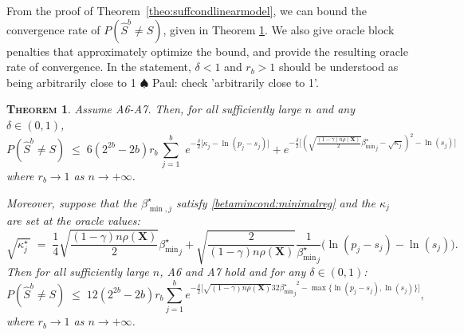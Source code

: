 \documentclass[aos]{imsart}
\theoremstyle{plain}
\newtheorem{thm}{\textsc{Theorem}}[section]
\newcommand{\paul}[1]{{\small{\color{green} \sf $\spadesuit$ Paul: #1}}}
\newcommand{\bs}{\boldsymbol}
\begin{document}
From the proof of Theorem~\ref{theo:suffcondlinearmodel}, we can bound the convergence rate of $P(\hat S^{b}\neq S)$, given in Theorem \ref{prop:fullrecovreg}. We also give oracle block penalties that approximately optimize the bound, and provide the resulting oracle rate of convergence. 
In the statement, $\delta<1$ and $r_b>1$ should be understood as being arbitrarily close to 1 \paul{check 'arbitrarily close to 1'}.
\begin{thm}\label{prop:fullrecovreg}
Assume A6-A7. Then, for all sufficiently large $n$ and any $\delta \in (0,1)$,
\begin{equation}\label{eq:rateconvreg}
 P(\hat{S}^{b} \neq S)\;\leq\; 6(2^{2b}-2b)r_b\,\sum_{j=1}^b\,\, e^{-\tfrac{\delta}{2}\big[\kappa_j-\ln(p_j-s_j)\big]} + 
    e^{-\tfrac{\delta}{2}\big[(\sqrt{\frac{(1-\gamma) n\rho(\bs X)}{2}}{{\beta_{\min}^{\star}}_j} - \sqrt{\kappa_j})^2 -\ln(s_j) \big]}
\end{equation}
where $r_b\to 1$ as $n\to +\infty$.

Moreover, suppose that the $\beta^\star_{\min,j}$ satisfy \eqref{betamincond:minimalreg} and the $\kappa_j$ are set at the oracle values:
	\begin{equation} \label{eq:oraclepenreg}
\sqrt{\kappa^\star_j\,} \;=\; \frac14\sqrt{\frac{(1-\gamma) n\rho(\bs X)}{2}}{{\beta_{\min}^{\star}}_j}+\sqrt{\frac{2}{(1-\gamma) n\rho(\bs X)}}\frac{1}{{\beta_{\min}^{\star}}_j}\big(\ln({p_j-s_j})-\ln({s_j})\big).
\end{equation}
Then for all sufficiently large $n$, A6 and A7 hold and for any $\delta \in (0,1)$: 
\begin{equation}\label{eq:oraclerateconvreg}
    P(\hat{S}^{b} \neq S) \; \leq \; 12(2^{2b}-2b)r_b \sum_{j=1}^b e^{-\tfrac{\delta}{2}\big[\sqrt{(1-\gamma) n\rho(\bs X)}{32}{{\beta_{\min}^{\star}}_j}^2-\max\{\ln(p_j-s_j),\ln(s_j)\}\big]},
\end{equation}
where $r_b\to 1$ as $n\to+\infty$.
\end{thm}
\end{document}
